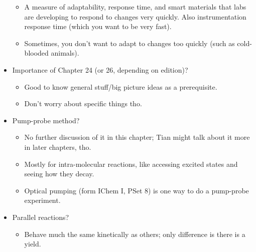 \documentclass[../notes.tex]{subfiles}
\begin{document}
\begin{itemize}
\begin{itemize}
        \item A measure of adaptability, response time, and smart materials that labs are developing to respond to changes very quickly. Also instrumentation response time (which you want to be very fast).
        \item Sometimes, you don't want to adapt to changes too quickly (such as cold-blooded animals).
    \end{itemize}
    \item Importance of Chapter 24 (or 26, depending on edition)?
    \begin{itemize}
        \item Good to know general stuff/big picture ideas as a prerequisite.
        \item Don't worry about specific things tho.
    \end{itemize}
    \item Pump-probe method?
    \begin{itemize}
        \item No further discussion of it in this chapter; Tian might talk about it more in later chapters, tho.
        \item Mostly for intra-molecular reactions, like accessing excited states and seeing how they decay.
        \item Optical pumping (form IChem I, PSet 8) is one way to do a pump-probe experiment.
    \end{itemize}
    \item Parallel reactions?
    \begin{itemize}
        \item Behave much the same kinetically as others; only difference is there is a yield.
    \end{itemize}
\end{itemize}
\end{document}
